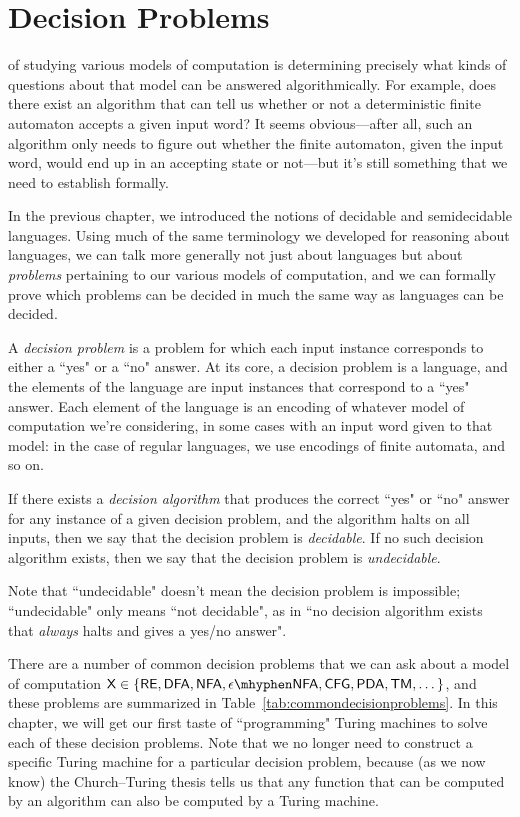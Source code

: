 \chapter{Decision Problems}\label{chap:decisionproblems}

 of studying various models of computation is determining precisely what kinds of questions about that model can be answered algorithmically. For example, does there exist an algorithm that can tell us whether or not a deterministic finite automaton accepts a given input word? It seems obvious---after all, such an algorithm only needs to figure out whether the finite automaton, given the input word, would end up in an accepting state or not---but it's still something that we need to establish formally.

In the previous chapter, we introduced the notions of decidable and semidecidable languages. Using much of the same terminology we developed for reasoning about languages, we can talk more generally not just about languages but about \emph{problems} pertaining to our various models of computation, and we can formally prove which problems can be decided in much the same way as languages can be decided.

A \emph{decision problem} is a problem for which each input instance corresponds to either a ``yes" or a ``no" answer. At its core, a decision problem is a language, and the elements of the language are input instances that correspond to a ``yes" answer. Each element of the language is an encoding of whatever model of computation we're considering, in some cases with an input word given to that model: in the case of regular languages, we use encodings of finite automata, and so on.

If there exists a \emph{decision algorithm} that produces the correct ``yes" or ``no" answer for any instance of a given decision problem, and the algorithm halts on all inputs, then we say that the decision problem is \emph{decidable}. If no such decision algorithm exists, then we say that the decision problem is \emph{undecidable}.

\begin{remark}
Note that ``undecidable" doesn't mean the decision problem is impossible; ``undecidable" only means ``not decidable", as in ``no decision algorithm exists that \emph{always} halts and gives a yes/no answer".
\end{remark}

There are a number of common decision problems that we can ask about a model of computation $\textsf{X} \in \{\RE, \DFA, \NFA, \ENFA, \CFG, \PDA, \TM, \dots\}$, and these problems are summarized in Table~\ref{tab:commondecisionproblems}. In this chapter, we will get our first taste of ``programming" Turing machines to solve each of these decision problems. Note that we no longer need to construct a specific Turing machine for a particular decision problem, because (as we now know) the Church--Turing thesis tells us that any function that can be computed by an algorithm can also be computed by a Turing machine.

